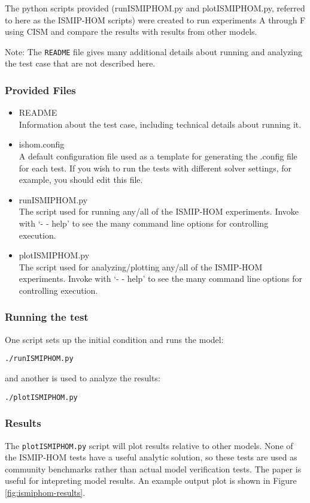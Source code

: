 The python scripts provided (runISMIPHOM.py and plotISMIPHOM.py, referred to here as the ISMIP-HOM 
scripts) were created to run experiments A through F using CISM and compare the results with results from other models. 

Note: The \texttt{README} file gives many additional details about running and analyzing the
test case that are not described here.

\subsubsection{Provided Files}

\begin{itemize}
	\item README \\
		Information about the test case, including technical details about running it.
	\item ishom.config \\
		A default configuration file used as a template for generating the .config file for each test.
    		If you wish to run the tests with different solver settings, for example, you should edit this file.
	\item runISMIPHOM.py \\
		The script used for running any/all of the ISMIP-HOM experiments.  
    		Invoke with `- - help' to see the many command line options for controlling execution.
  \item plotISMIPHOM.py \\
		The script used for analyzing/plotting any/all of the ISMIP-HOM experiments.  
    		Invoke with `- - help' to see the many command line options for controlling execution.
\end{itemize}

\subsubsection{Running the test}
One script sets up the initial condition and runs the model:

\texttt{./runISMIPHOM.py}

\noindent
and another is used to analyze the results:

\texttt{./plotISMIPHOM.py}

\subsubsection{Results}
The \texttt{plotISMIPHOM.py} script will plot results relative to other models.
None of the ISMIP-HOM tests have a useful analytic solution, so these tests are
used as community benchmarks rather than actual model verification tests.
The \citet{Pattyn2008} paper is useful for intepreting model results.
An example output plot is shown in Figure \ref{fig:ismiphom-results}.

